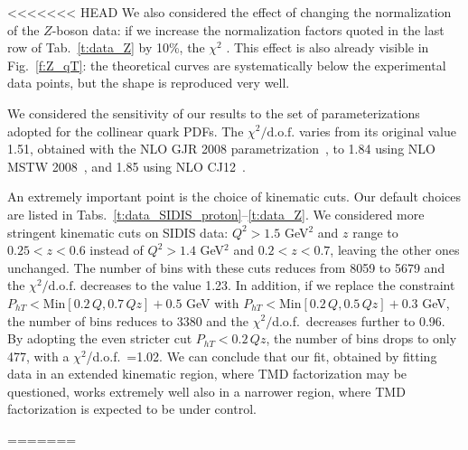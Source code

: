 \documentclass[aps,preprintnumbers,showpacs,nofootinbib,superscriptaddress,floatfix]{revtex4}
\newcommand{\compass}{\textsc{Compass}}
\begin{document}
<<<<<<< HEAD
We also considered the effect of changing the normalization of the $Z$-boson
data: if we increase the normalization factors quoted
in the last row of Tab.~\ref{t:data_Z} by 10\%, the $\chi^2$ . This effect is
also already visible in Fig.~\ref{f:Z_qT}: the theoretical curves are
systematically below the experimental data points, but the shape is reproduced
very well.

We considered the sensitivity of our results to the set of
parameterizations adopted for the collinear quark PDFs. 
The $\chi^2/ \text{d.o.f.}$ varies from its original value
1.51, obtained with the NLO GJR 2008 parametrization~\cite{Gluck:2007ck}, to
1.84 using NLO MSTW 2008~\cite{Martin:2009iq}, and 1.85 using NLO
CJ12~\cite{Owens:2012bv}. 

An extremely important point is the choice of kinematic cuts. Our default
choices are listed in Tabs.~\ref{t:data_SIDIS_proton}--\ref{t:data_Z}. We
considered more stringent kinematic cuts on SIDIS data: 
$Q^2 > 1.5$ GeV$^2$ and $z$ range to 
$0.25 < z < 0.6$ instead of $Q^2 > 1.4$ GeV$^2$ and $0.2 < z <
0.7$, leaving the other ones unchanged. The number of bins with these cuts 
reduces from 8059 to 5679 and 
the  $\chi^2/ \text{d.o.f.}$  decreases to the
value 1.23. 
In addition, if we replace the constraint  $P_{h T} < \text{Min} [
0.2\, Q, 0.7\, Q z] + 0.5$ GeV  
with $P_{h T} < \text{Min} [ 0.2\, Q, 0.5\, Q z] +
0.3$ GeV, the number of bins reduces to 3380 and the $\chi^2/$d.o.f.\ decreases
further to 0.96. By adopting the even stricter 
cut $P_{h T} < 0.2\, Q z$, 
the number of bins drops to only 477, with  a 
 $\chi^2$/d.o.f.\ =1.02.  We can conclude that our fit, obtained by
 fitting data in an extended kinematic region, where TMD factorization may be
 questioned,  works extremely well also in a narrower
 region, where TMD factorization is expected to be under control.


%
%
=======
\end{document}
